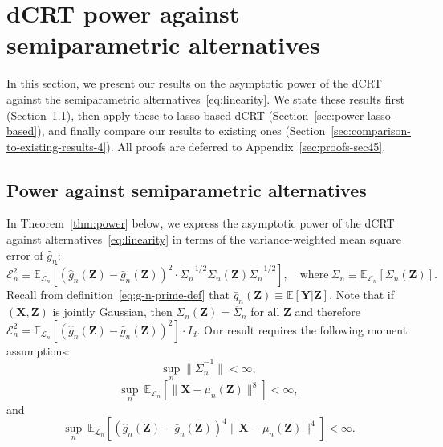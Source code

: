 \documentclass[12pt]{article}
\theoremstyle{definition}
\theoremstyle{remark}
\newcommand{\prx}{\bm X}
\newcommand{\prz}{\bm Z}
\newcommand{\pry}{{\bm Y}}
\begin{document}
\section{dCRT power against semiparametric alternatives} \label{sec:asymptotic-power}

In this section, we present our results on the asymptotic power of the dCRT against the semiparametric alternatives~\eqref{eq:linearity}. We state these results first (Section~\ref{sec:power-results}), then apply these to lasso-based dCRT (Section~\ref{sec:power-lasso-based}), and finally compare our results to existing ones (Section~\ref{sec:comparison-to-existing-results-4}). All proofs are deferred to Appendix~\ref{sec:proofs-sec45}.

\subsection{Power against semiparametric alternatives} \label{sec:power-results}

In Theorem~\ref{thm:power} below, we express the asymptotic power of the dCRT against alternatives~\eqref{eq:linearity} in terms of the variance-weighted mean square  error of $\widehat g_n$:
\begin{equation} 
	\mathcal E^2_n \equiv  \mathbb E_{\mathcal L_n}\left[(\widehat g_n(\prz)-\bar g_n(\prz))^2 \cdot \overline \Sigma_n^{-1/2}\Sigma_n(\prz)\overline \Sigma_n^{-1/2}\right], \quad \text{where} \ \overline \Sigma_n\equiv \mathbb E_{\mathcal L_n}[\Sigma_n(\prz)].
\end{equation}
Recall from definition~\eqref{eq:g-n-prime-def} that $\bar g_n(\prz) \equiv \mathbb E[\pry|\prz]$. Note that if $(\prx, \prz)$ is jointly Gaussian, then $\Sigma_n(\prz) = \overline \Sigma_n$ for all $\prz$ and therefore $\mathcal E_n^2 = \mathbb E_{\mathcal L_n}[(\widehat g_n(\prz)-\bar g_n(\prz))^2] \cdot I_d$. Our result requires the following moment assumptions:
	\begin{equation}
\sup_{n} \|\overline \Sigma_n^{-1}\| < \infty,
\label{eq:s-n-inverse-assump}
\end{equation}
\begin{equation}
	\sup_n\ \mathbb E_{\mathcal L_n}[\|\prx - \mu_n(\prz)\|^8] < \infty,
	\label{eq:eighth-moment-assump-1}
\end{equation}
and
\begin{equation}
	\sup_n\ \mathbb E_{\mathcal L_n}[(\widehat g_n(\prz)-\bar g_n(\prz))^4\|\prx - \mu_n(\prz)\|^4] < \infty.
	\label{eq:eighth-moment-assump-2}
\end{equation}
\end{document}
